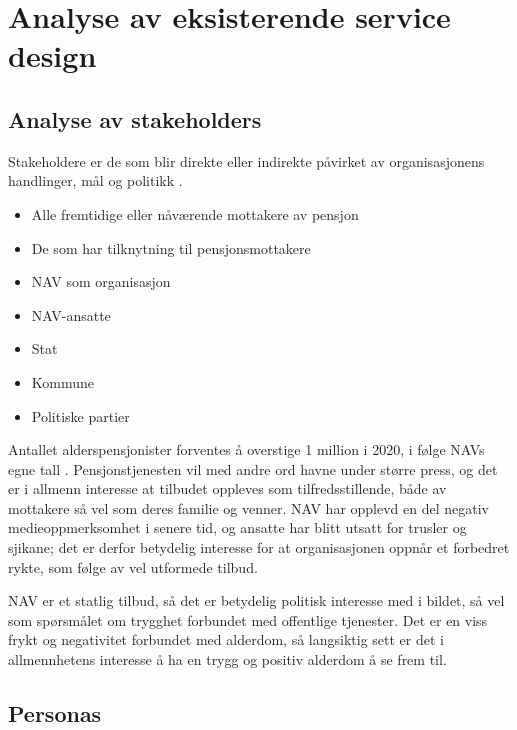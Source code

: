 \documentclass[informationsecurity]{gucmasterproject}
\begin{document}
\chapter{Analyse av eksisterende service design}
\section{Analyse av stakeholders}
Stakeholdere er de som blir direkte eller indirekte påvirket av organisasjonens handlinger, mål og politikk \cite{stakeholder}.
\begin{itemize}
\item Alle fremtidige eller nåværende mottakere av pensjon
\item De som har tilknytning til pensjonsmottakere
\item NAV som organisasjon
\item NAV-ansatte
\item Stat
\item Kommune
\item Politiske partier
\end{itemize}

Antallet alderspensjonister forventes å overstige 1 million i 2020, i følge NAVs egne tall \cite{antallpassert}. Pensjonstjenesten vil med andre ord havne under større press, og det er i allmenn interesse at tilbudet oppleves som tilfredsstillende, både av mottakere så vel som deres familie og venner. NAV har opplevd en del negativ medieoppmerksomhet i senere tid, og ansatte har blitt utsatt for trusler og sjikane; det er derfor betydelig interesse for at organisasjonen oppnår et forbedret rykte, som følge av vel utformede tilbud.

NAV er et statlig tilbud, så det er betydelig politisk interesse med i bildet, så vel som spørsmålet om trygghet forbundet med offentlige tjenester. Det er en viss frykt og negativitet forbundet med alderdom, så langsiktig sett er det i allmennhetens interesse å ha en trygg og positiv alderdom å se frem til.



\section{Personas}
\end{document}

